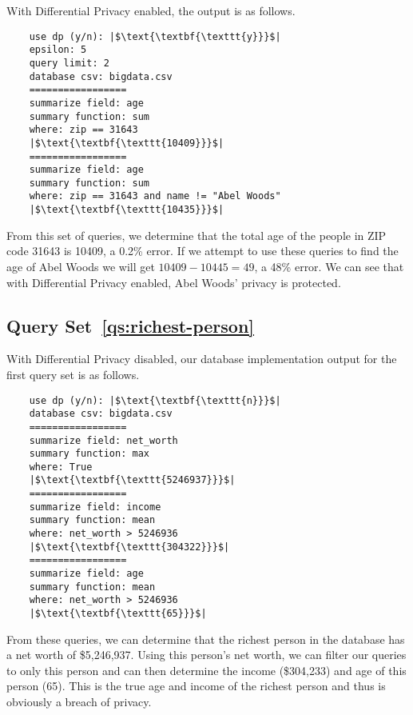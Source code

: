 \documentclass[conference,11pt]{IEEEtran}
\begin{document}
With Differential Privacy enabled, the output is as follows.
\begin{verbatim}
    use dp (y/n): |$\text{\textbf{\texttt{y}}}$|
    epsilon: 5
    query limit: 2
    database csv: bigdata.csv
    =================
    summarize field: age
    summary function: sum
    where: zip == 31643
    |$\text{\textbf{\texttt{10409}}}$|
    =================
    summarize field: age
    summary function: sum
    where: zip == 31643 and name != "Abel Woods"
    |$\text{\textbf{\texttt{10435}}}$|
\end{verbatim}
From this set of queries, we determine that the total age of the people in ZIP
code 31643 is 10409, a 0.2\% error. If we attempt to use these queries to find
the age of Abel Woods we will get $10409 - 10445 = 49$, a 48\% error. We can see
that with Differential Privacy enabled, Abel Woods' privacy is protected.

\subsection{Query Set~\ref{qs:richest-person}}
With Differential Privacy disabled, our database implementation output for the
first query set is as follows.
\begin{verbatim}
    use dp (y/n): |$\text{\textbf{\texttt{n}}}$|
    database csv: bigdata.csv
    =================
    summarize field: net_worth
    summary function: max
    where: True
    |$\text{\textbf{\texttt{5246937}}}$|
    =================
    summarize field: income
    summary function: mean
    where: net_worth > 5246936
    |$\text{\textbf{\texttt{304322}}}$|
    =================
    summarize field: age
    summary function: mean
    where: net_worth > 5246936
    |$\text{\textbf{\texttt{65}}}$|
\end{verbatim}
From these queries, we can determine that the richest person in the database has
a net worth of \$5,246,937. Using this person's net worth, we can filter our
queries to only this person and can then determine the income (\$304,233) and
age of this person (65). This is the true age and income of the richest person
and thus is obviously a breach of privacy.
\end{document}
